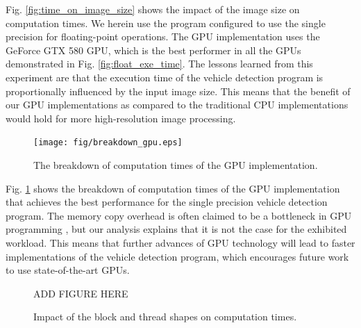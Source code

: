 Fig. \ref{fig:time_on_image_size} shows the impact of the image size on
computation times. 
We herein use the program configured to use the single precision for
floating-point operations.
The GPU implementation uses the GeForce GTX 580 GPU, which is the best
performer in all the GPUs demonstrated in Fig. \ref{fig:float_exe_time}.
The lessons learned from this experiment are that the execution time of
the vehicle detection program is proportionally influenced by the input
image size.
This means that the benefit of our GPU implementations as compared to
the traditional CPU implementations would hold for more high-resolution
image processing.

\begin{figure}[t]
 \begin{center}
  \texttt{[image: fig/breakdown\_gpu.eps]}\\
  \caption{The breakdown of computation times of the GPU implementation.}
  \label{fig:breakdown_gpu}
 \end{center}
\end{figure}

Fig. \ref{fig:breakdown_gpu} shows the breakdown of computation times of
the GPU implementation that achieves the best performance for the single
precision vehicle detection program.
The memory copy overhead is often claimed to be a bottleneck in GPU
programming \cite{Jablin_PLDI11}, but our analysis explains that it is
not the case for the exhibited workload.
This means that further advances of GPU technology will lead to faster
implementations of the vehicle detection program, which encourages
future work to use state-of-the-art GPUs.

\begin{figure}[t]
 \begin{center}
  ADD FIGURE HERE 
  \caption{Impact of the block and thread shapes on computation times.}
  \label{fig:time_on_block_thread_shapes}
 \end{center}
\end{figure}

